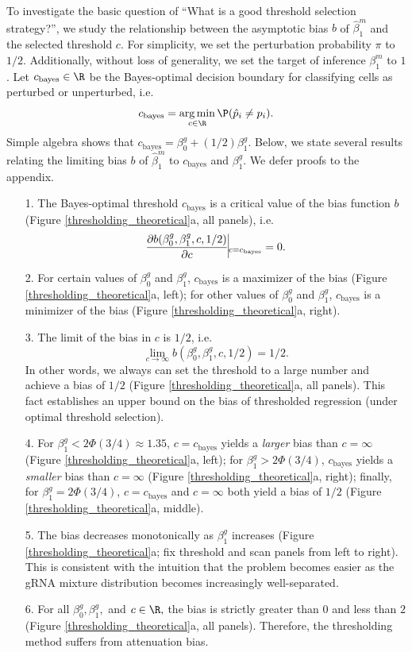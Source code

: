 \documentclass[12pt]{article}
\DeclareMathOperator*{\argmin}{arg\,min}
\begin{document}
To investigate the basic question of ``What is a good threshold selection strategy?'', we study the relationship between the asymptotic bias $b$ of $\hat{\beta}^m_1$ and the selected threshold $c$. For simplicity, we set the perturbation probability $\pi$ to $1/2$. Additionally, without loss of generality, we set the target of inference $\beta^m_1$ to $1$. Let $c_\textrm{bayes} \in \R$ be the Bayes-optimal decision boundary for classifying cells as perturbed or unperturbed, i.e. $$c_\textrm{bayes} = \argmin_{c \in \R} \P(\hat{p}_i \neq p_i).$$ Simple algebra shows that $c_\textrm{bayes} = \beta_0^g + (1/2) \beta^g_1.$ Below, we state several results relating the limiting bias $b$ of $\hat{\beta}^m_1$ to $c_\textrm{bayes}$ and $\beta^g_1$. We defer proofs to the appendix.

\begin{itemize}
\item[1.] The Bayes-optimal threshold $c_\textrm{bayes}$ is a critical value of the bias function $b$ (Figure \ref{thresholding_theoretical}a, all panels), i.e. 
$$ \frac{\partial b( \beta^g_0, \beta^g_1, c, 1/2)}{\partial c} \vline_{c = c_\textrm{bayes}} = 0.$$
\item[2.] For certain values of $\beta^g_0$ and $\beta^g_1$, $c_\textrm{bayes}$ is a maximizer of the bias (Figure \ref{thresholding_theoretical}a, left); for other values of $\beta^g_0$ and $\beta^g_1$, $c_\textrm{bayes}$ is a minimizer of the bias (Figure \ref{thresholding_theoretical}a, right).
\item[3.] The limit of the bias in $c$ is $1/2$, i.e. 
$$\lim_{c \to \infty} b(\beta^g_0, \beta^g_1, c, 1/2) = 1/2.$$ In other words, we always can set the threshold to a large number and achieve a bias of $1/2$ (Figure \ref{thresholding_theoretical}a, all panels). This fact establishes an upper bound on the bias of thresholded regression (under optimal threshold selection).
\item[4.] For $\beta^g_1 < 2 \Phi(3/4) \approx 1.35$, $c = c_\textrm{bayes}$ yields a \textit{larger} bias than $c = \infty$ (Figure \ref{thresholding_theoretical}a, left); for $\beta^g_1 > 2 \Phi(3/4)$, $c_\textrm{bayes}$ yields a \textit{smaller} bias than $c = \infty$ (Figure \ref{thresholding_theoretical}a, right); finally, for $\beta^g_1 = 2 \Phi(3/4)$, $c = c_\textrm{bayes}$ and $c = \infty$ both yield a bias of $1/2$ (Figure \ref{thresholding_theoretical}a, middle).
\item[5.] The bias decreases monotonically as $\beta_1^g$ increases (Figure \ref{thresholding_theoretical}a; fix threshold and scan panels from left to right). This is consistent with the intuition that the problem becomes easier as the gRNA mixture distribution becomes increasingly well-separated.
\item[6.] For all $\beta^g_0, \beta^g_1,$ and $c \in \R,$ the bias is strictly greater than $0$ and less than $2$ (Figure \ref{thresholding_theoretical}a, all panels). Therefore, the thresholding method suffers from attenuation bias.%
\end{itemize}
\end{document}
